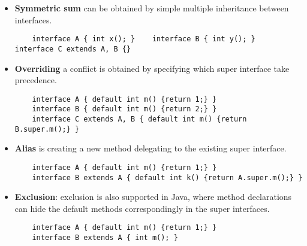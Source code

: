 \begin{itemize}
\item \textbf{Symmetric sum} can be obtained by simple multiple inheritance between interfaces.
\shortItem
    \begin{lstlisting}
    interface A { int x(); }    interface B { int y(); }    interface C extends A, B {}
    \end{lstlisting}
\shortItem
\item \textbf{Overriding} a conflict is obtained by specifying which super interface take precedence.
\shortItem
    \begin{lstlisting}
    interface A { default int m() {return 1;} } 
    interface B { default int m() {return 2;} }
    interface C extends A, B { default int m() {return B.super.m();} }
    \end{lstlisting}
\shortItem
\item \textbf{Alias} is creating  a new method delegating to the existing super interface.
\shortItem
    \begin{lstlisting}
    interface A { default int m() {return 1;} }
    interface B extends A { default int k() {return A.super.m();} }
    \end{lstlisting}
\shortItem

\item \textbf{Exclusion}: exclusion is also supported in Java, where method declarations can hide the default methods correspondingly in the super interfaces.
\shortItem
    \begin{lstlisting}
    interface A { default int m() {return 1;} }
    interface B extends A { int m(); }
    \end{lstlisting}
\shortItem
\end{itemize}


